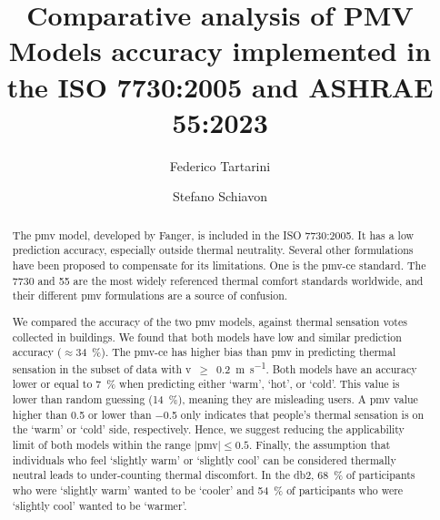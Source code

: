 \begin{frontmatter}

    \title{Comparative analysis of PMV Models accuracy implemented in the ISO 7730:2005 and ASHRAE 55:2023}

    \author[label1]{Federico Tartarini}
    \author[label3]{Stefano Schiavon}

    \address[label1]{School of Architecture, Design, and Planning, The University of Sydney, Sydney, AU}
    \address[label3]{Center for the Built Environment, Department of Architecture, Department of Civil and Environmental Engineering, University of California, Berkeley, CA, USA}


    \begin{abstract}
        The \ac{pmv} model, developed by Fanger, is included in the ISO 7730:2005.
        It has a low prediction accuracy, especially outside thermal neutrality.
        Several other formulations have been proposed to compensate for its limitations.
        One is the \ac{pmv-ce} standard.
        The \gls{7730} and \gls{55} are the most widely referenced thermal comfort standards worldwide, and their different \ac{pmv} formulations are a source of confusion.

        We compared the accuracy of the two \ac{pmv} models, against  thermal sensation votes collected in buildings.
        We found that both models have low and similar prediction accuracy ($\approx$\qty{34}{\percent}).
        The \ac{pmv-ce} has higher bias than \ac{pmv} in predicting thermal sensation in the subset of data with \acl{v}~$\geq$~\qty{0.2}{\m\per\s}.
        Both models have an accuracy lower or equal to \qty{7}{\percent} when predicting either `warm', `hot', or `cold'.
        This value is lower than random guessing (\qty{14}{\percent}), meaning they are misleading users.
        A \ac{pmv} value higher than \num{.5} or lower than \num{-.5} only indicates that people's thermal sensation is on the `warm' or `cold' side, respectively.
        Hence, we suggest reducing the applicability limit of both models within the range $\mid$\ac{pmv}$\mid \leq 0.5$.
        Finally, the assumption that individuals who feel `slightly warm' or `slightly cool' can be considered thermally neutral leads to under-counting thermal discomfort.
        In the \acl{db2}, \qty{68}{\percent} of participants who were `slightly warm' wanted to be `cooler' and \qty{54}{\percent} of participants who were `slightly cool' wanted to be `warmer'.
    \end{abstract}


\end{frontmatter}
